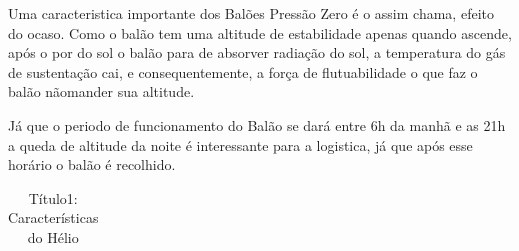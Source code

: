     Uma caracteristica importante dos Balões Pressão Zero é o assim chama, efeito do ocaso. Como o balão tem uma altitude de estabilidade apenas quando ascende, após o por do sol o balão para de absorver radiação do sol, a temperatura do gás de sustentação cai, e consequentemente, a  força de flutuabilidade o que faz o balão nãomander sua altitude.
    
    Já que o periodo de funcionamento do Balão se dará entre 6h da manhã e as 21h a queda de altitude da noite é interessante  para a logistica, já que após esse horário o balão é recolhido.
    
\begin{table}[h]
\caption{Título1: Características do Hélio}
\vspace{0.5cm}
\begin{tabular}{r|lr}
\hline


\end{tabular}
\end{table}
